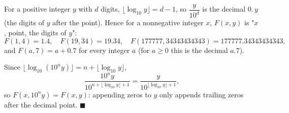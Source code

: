 For a positive integer $y$ with $d$ digits, $\lfloor\log_{10}y\rfloor=d-1$, so $\dfrac{y}{10^{d}}$ is the decimal $0.\,y$ (the digits of $y$ after the point). Hence for a nonnegative integer $x$, $F(x,y)$ is "$x$, point, the digits of $y$":
\[
F(1,4)=\boxed{1.4},\quad F(19,34)=\boxed{19.34},\quad F(177777,34343434343)=\boxed{177777.34343434343},
\]
and $F(a,7)=\boxed{a+0.7}$ for every integer $a$ (for $a\ge0$ this is the decimal $a.7$).

Since $\lfloor\log_{10}(10^ny)\rfloor=n+\lfloor\log_{10}y\rfloor$,
\[
\dfrac{10^ny}{10^{n+\lfloor\log_{10}y\rfloor+1}}=\dfrac{y}{10^{\lfloor\log_{10}y\rfloor+1}},
\]
so $F(x,10^ny)=F(x,y)$: appending zeros to $y$ only appends trailing zeros after the decimal point. $\blacksquare$
